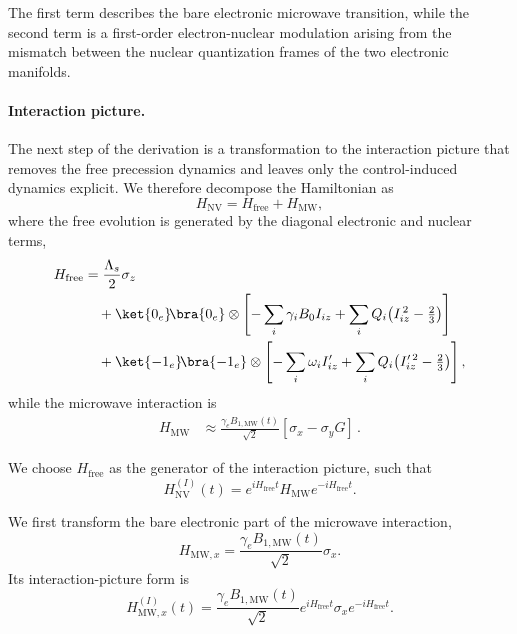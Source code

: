 \documentclass[
  aps,
  pra,
  reprint,            %
  superscriptaddress, %
  amsmath,amssymb,
  notitlepage
]{revtex4-2}
\begin{document}
The first term describes the bare electronic microwave transition, while the second term is a first-order electron-nuclear modulation arising from the mismatch between the nuclear quantization frames of the two electronic manifolds.\\


\paragraph{Interaction picture.}

The next step of the derivation is a transformation to the interaction picture that removes the free precession dynamics and leaves only the control-induced dynamics explicit. We therefore decompose the Hamiltonian as
\begin{equation}
H_{\mathrm{NV}}
=
H_{\mathrm{free}}
+
H_{\mathrm{MW}},
\label{eq:H_split}
\end{equation}
where the free evolution is generated by the diagonal electronic and nuclear
terms,
\begin{equation}
\begin{aligned}
H_{\mathrm{free}}
&=
\frac{\Lambda_s}{2}\sigma_z
\\
&\quad
+
\ket{0_e}\!\bra{0_e}\otimes
\left[
-\sum_i\gamma_iB_0 I_{iz}
+
\sum_iQ_i\!\left(I_{iz}^{\,2}-\tfrac23\right)
\right]
\\
&\quad
+
\ket{-1_e}\!\bra{-1_e}\otimes
\left[
-\sum_i\omega_i I'_{iz}
+
\sum_iQ_i\!\left(I_{iz}'^{\,2}-\tfrac23\right)
\right],
\end{aligned}
\label{eq:H_free}
\end{equation}
while the microwave interaction is
\begin{equation}
\begin{aligned}
H_{\mathrm{MW}}
&\approx
\frac{\gamma_e B_{1,\mathrm{MW}}(t)}{\sqrt2}
\left[
\sigma_x
-
\sigma_y G
\right]\,.
\end{aligned}
\label{eq:HMW_rot}
\end{equation}


We choose \(H_{\mathrm{free}}\) as the generator of the interaction picture, such that
\begin{equation}
H_{\mathrm{NV}}^{(I)}(t)
=
e^{iH_{\mathrm{free}}t}
H_{\mathrm{MW}}
e^{-iH_{\mathrm{free}}t}.
\label{eq:IP_transform}
\end{equation}

We first transform the bare electronic part of the microwave interaction,
\[
H_{\mathrm{MW},x}
=
\frac{\gamma_e B_{1,\mathrm{MW}}(t)}{\sqrt2}\sigma_x .
\]
Its interaction-picture form is
\begin{equation}
H_{\mathrm{MW},x}^{(I)}(t)
=
\frac{\gamma_e B_{1,\mathrm{MW}}(t)}{\sqrt2}
e^{iH_{\mathrm{free}}t}
\sigma_x
e^{-iH_{\mathrm{free}}t}.
\label{eq:HMWx_IP_start}
\end{equation}
\end{document}

